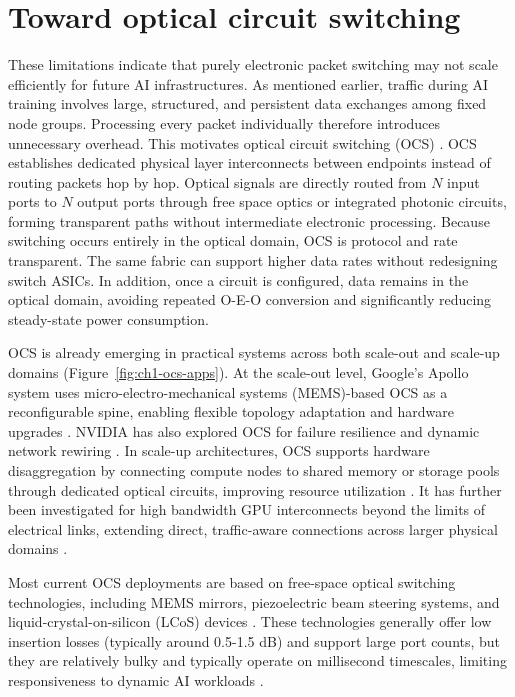 \section{Toward optical circuit switching} \label{sec:toc}
These limitations indicate that purely electronic packet switching may not scale efficiently for future AI infrastructures.
As mentioned earlier, traffic during AI training involves large, structured, and persistent data exchanges among fixed node groups.
Processing every packet individually therefore introduces unnecessary overhead.
This motivates optical circuit switching (OCS) \cite{macnica_coherent}.
OCS establishes dedicated physical layer interconnects between endpoints instead of routing packets hop by hop.
Optical signals are directly routed from $N$ input ports to $N$ output ports through free space optics or integrated photonic circuits, forming transparent paths without intermediate electronic processing.
Because switching occurs entirely in the optical domain, OCS is protocol and rate transparent.
The same fabric can support higher data rates without redesigning switch ASICs.
In addition, once a circuit is configured, data remains in the optical domain, avoiding repeated O-E-O conversion and significantly reducing steady-state power consumption.

OCS is already emerging in practical systems across both scale-out and scale-up domains (Figure~\ref{fig:ch1-ocs-apps}).
At the scale-out level, Google's Apollo system uses micro-electro-mechanical systems (MEMS)-based OCS as a reconfigurable spine, enabling flexible topology adaptation and hardware upgrades \cite{urata2023apollo, jupiter}.
NVIDIA has also explored OCS for failure resilience and dynamic network rewiring \cite{patronas2024optical}.
In scale-up architectures, OCS supports hardware disaggregation by connecting compute nodes to shared memory or storage pools through dedicated optical circuits, improving resource utilization \cite{8293994}.
It has further been investigated for high bandwidth GPU interconnects beyond the limits of electrical links, extending direct, traffic-aware connections across larger physical domains \cite{addanki2025vermilion}.

Most current OCS deployments are based on free-space optical switching technologies, including MEMS mirrors, piezoelectric beam steering systems, and liquid-crystal-on-silicon (LCoS) devices \cite{lumentum_ocs, polatis7000, coherent_ocs}.
These technologies generally offer low insertion losses (typically around 0.5-1.5 dB) and support large port counts, but they are relatively bulky and typically operate on millisecond timescales, limiting responsiveness to dynamic AI workloads \cite{1244924, CignalAI2025OCS4Q25}.

